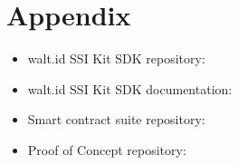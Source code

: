 \chapter{Appendix}
\begin{itemize}
    \item walt.id SSI Kit SDK repository: \href{https://github.com/0xCaso/waltid-ssikit-sdk}{}
    \item walt.id SSI Kit SDK documentation: \href{https://matteocasonato.gitbook.io/ssikit-sdk/}{}
    \item Smart contract suite repository: \href{https://github.com/mmatteo23/monokee_smart_contracts_suite}{}
    \item Proof of Concept repository: \href{https://github.com/monokee-dev/stage-unipd-casonato-midena}{}
\end{itemize}